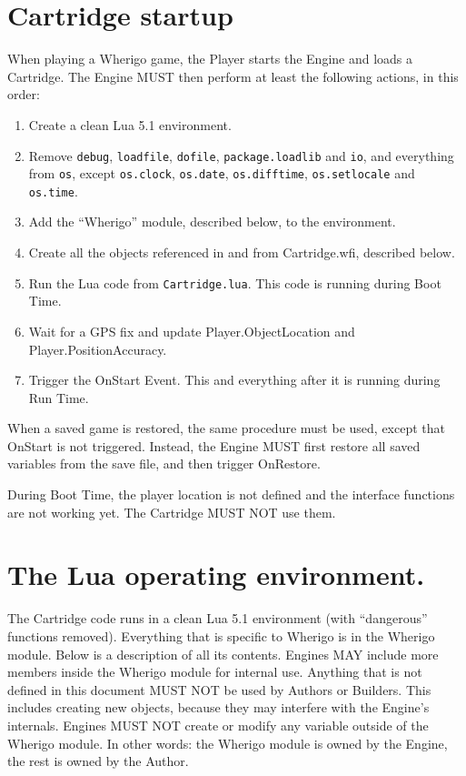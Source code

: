 \documentclass{article}
\begin{document}
\section{Cartridge startup}
When playing a Wherigo game, the Player starts the Engine and loads a
Cartridge. The Engine MUST then perform at least the following actions, in this
order:

\begin{enumerate}
\item Create a clean Lua 5.1 environment.
\item Remove \verb-debug-, \verb-loadfile-, \verb-dofile-,
	\verb-package.loadlib- and \verb-io-, and everything from \verb-os-,
	except \verb-os.clock-, \verb-os.date-, \verb-os.difftime-,
	\verb-os.setlocale- and \verb-os.time-.
\item Add the ``Wherigo'' module, described below, to the environment.
\item Create all the objects referenced in and from Cartridge.wfi, described below.
\item Run the Lua code from \verb-Cartridge.lua-. This code is running during Boot Time.
\item Wait for a GPS fix and update Player.ObjectLocation and Player.PositionAccuracy.
\item Trigger the OnStart Event. This and everything after it is running during Run Time.
\end{enumerate}

When a saved game is restored, the same procedure must be used, except that
OnStart is not triggered.  Instead, the Engine MUST first restore all saved
variables from the save file, and then trigger OnRestore.

During Boot Time, the player location is not defined and the interface
functions are not working yet.  The Cartridge MUST NOT use them.

\section{The Lua operating environment.}

The Cartridge code runs in a clean Lua 5.1 environment (with ``dangerous''
functions removed). Everything that is specific to Wherigo is in the Wherigo
module. Below is a description of all its contents. Engines MAY include more
members inside the Wherigo module for internal use. Anything that is not
defined in this document MUST NOT be used by Authors or Builders. This includes
creating new objects, because they may interfere with the Engine's internals.
Engines MUST NOT create or modify any variable outside of the Wherigo module.
In other words: the Wherigo module is owned by the Engine, the rest is owned by
the Author.
\end{document}
